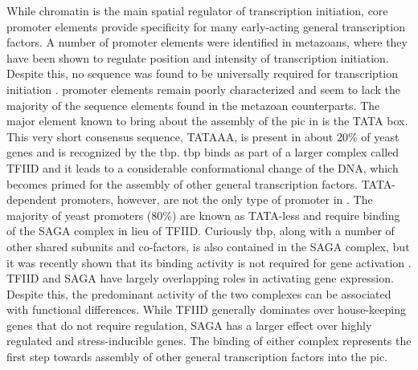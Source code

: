 While chromatin is the main spatial regulator of transcription initiation, core promoter elements provide specificity for many early-acting general transcription factors. 
A number of promoter elements were identified in metazoans, where they have been shown to regulate position and intensity of transcription initiation.
Despite this, no sequence was found to be universally required for transcription initiation \cite{butler:2002:RNA}.
\cer promoter elements remain poorly characterized and seem to lack the majority of the sequence elements found in the metazoan counterparts. 
The major element known to bring about the assembly of the \gls{pic} in \cer is the TATA box.
This very short consensus sequence, TATAAA, is present in about 20\% of yeast genes and is recognized by the \gls{tbp}. 
\gls{tbp} binds as part of a larger complex called TFIID and it leads to a considerable conformational change of the DNA, which becomes primed for the assembly of other general transcription factors. 
TATA-dependent promoters, however, are not the only type of promoter in \cer. 
The majority of yeast promoters (80\%)  are known as TATA-less and require binding of the SAGA complex in lieu of TFIID. 
Curiously \gls{tbp}, along with a number of other shared subunits and co-factors, is also contained in the SAGA complex, but it was recently shown that its binding activity is not required for gene activation .
TFIID and SAGA have largely overlapping roles in activating gene expression.
Despite this, the predominant activity of the two complexes can be associated with functional differences.
While TFIID generally dominates over house-keeping genes that do not require regulation, SAGA has a larger effect over highly regulated and stress-inducible genes.
The binding of either complex represents the first step towards assembly of other general transcription factors into the \gls{pic}.




